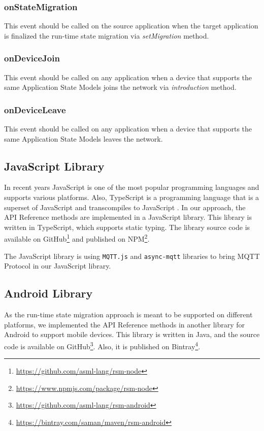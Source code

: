 \subsubsection{onStateMigration}
This event should be called on the source application when the target application is finalized the run-time state migration via \textit{setMigration} method.

\subsubsection{onDeviceJoin}
This event should be called on any application when a device that supports the same Application State Models joins the network via \textit{introduction} method.

\subsubsection{onDeviceLeave}
This event should be called on any application when a device that supports the same Application State Models leaves the network.


\subsection{JavaScript Library}
In recent years JavaScript is one of the most popular programming languages and supports various platforms. Also, TypeScript is a programming language that is a superset of JavaScript and transcompiles to JavaScript  \cite{typescript}. In our approach, the API Reference methods are implemented in a JavaScript library. This library is written in TypeScript, which supports static typing. The library source code is available on GitHub\footnote{\url{https://github.com/asml-lang/rsm-node}} and published on NPM\footnote{\url{https://www.npmjs.com/package/rsm-node}}.

The JavaScript library is using \lstinline[basicstyle=\ttfamily]{MQTT.js} and \lstinline[basicstyle=\ttfamily]{async-mqtt} libraries to bring MQTT Protocol in our JavaScript library.


\subsection{Android Library}
As the run-time state migration approach is meant to be supported on different platforms, we implemented the API Reference methods in another library for Android to support mobile devices. This library is written in Java, and
the source code is available on GitHub\footnote{\url{https://github.com/asml-lang/rsm-android}}. Also, it is published on Bintray\footnote{\url{https://bintray.com/saman/maven/rsm-android}}.

